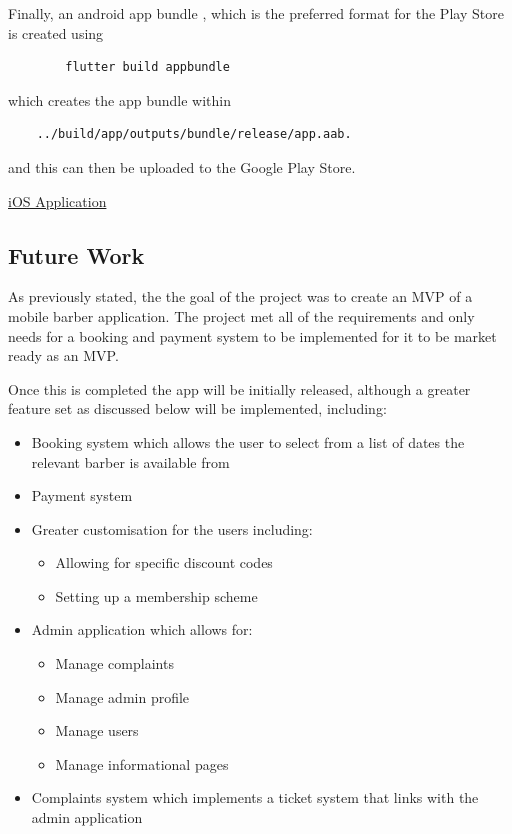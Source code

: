 \documentclass[12pt]{article}
\begin{document}
	Finally, an android app bundle \cite{androidAndroidAppBundle2021}, which is the preferred format for the Play Store is created using 
	\begin{lstlisting}
		flutter build appbundle
	\end{lstlisting}
	which creates the app bundle within 
	\begin{lstlisting}
	../build/app/outputs/bundle/release/app.aab.
	\end{lstlisting}
	and this can then be uploaded to the Google Play Store.
	
	\underline{iOS Application}
	\\
	
	
	\subsection{Future Work}
	
	As previously stated, the the goal of the project was to create an MVP of a mobile barber application. The project met all of the requirements and only needs for a booking and payment system to be implemented for it to be market ready as an MVP.
	
	Once this is completed the app will be initially released, although a greater feature set as discussed below will be implemented, including:
	
	\begin{itemize}
		\item Booking system which allows the user to select from a list of dates the relevant barber is available from
		\item Payment system
		\item Greater customisation for the users including:
		\begin{itemize}
			\item Allowing for specific discount codes
			\item Setting up a membership scheme
		\end{itemize}
		\item Admin application which allows for:
		\begin{itemize}
			\item Manage complaints
			\item Manage admin profile
			\item Manage users
			\item Manage informational pages
		\end{itemize}
		\item Complaints system which implements a ticket system that links with the admin application
	\end{itemize}
	
\end{document}
